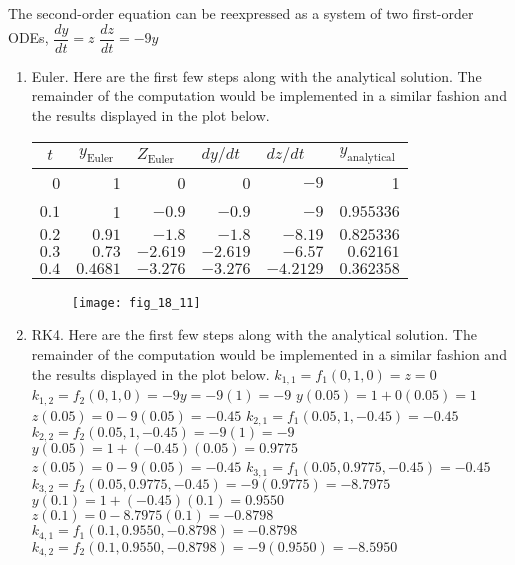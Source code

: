 \documentclass[../main.tex]{subfiles}
\begin{document}
\section{}
The second-order equation can be reexpressed as a system of two first-order ODEs,
	\bigbreak
$\dfrac{d y}{d t}=z$
	\bigbreak
$\dfrac{d z}{d t}=-9 y$
	\bigbreak
\begin{enumerate}[label=\bfseries(\alph*)]
\item Euler. Here are the first few steps along with the analytical solution. The remainder of the computation would be implemented in a similar fashion and the results displayed in the plot below.
	\bigbreak
\begin{tabular}{rrrrrr}
\hline
\multicolumn{1}{c}{$t$} & \multicolumn{1}{c}{$y_{\text {Euler }}$} & \multicolumn{1}{l}{$Z_{\text {Euler }}$} & \multicolumn{1}{l}{$d y / d t$} & \multicolumn{1}{l}{$d z / d t$} & \multicolumn{1}{l}{$y_{\text {analytical }}$} \\
\hline
0 & 1 & 0 & 0 & $-9$ & 1 \\
$0.1$ & 1 & $-0.9$ & $-0.9$ & $-9$ & $0.955336$ \\
$0.2$ & $0.91$ & $-1.8$ & $-1.8$ & $-8.19$ & $0.825336$ \\
$0.3$ & $0.73$ & $-2.619$ & $-2.619$ & $-6.57$ & $0.62161$ \\
$0.4$ & $0.4681$ & $-3.276$ & $-3.276$ & $-4.2129$ & $0.362358$ \\
\hline
\end{tabular}
	\bigbreak
	\begin{figure}[H]
		\texttt{[image: fig\_18\_11]}
		\label{fig:fig_18_11}
	\end{figure}
	\bigbreak
\item RK4. Here are the first few steps along with the analytical solution. The remainder of the computation would be implemented in a similar fashion and the results displayed in the plot below.
	\bigbreak
$k_{1,1}=f_{1}(0,1,0)=z=0 $\bigbreak
$k_{1,2}=f_{2}(0,1,0)=-9 y=-9(1)=-9 $\bigbreak
$y(0.05)=1+0(0.05)=1 $\bigbreak
$z(0.05)=0-9(0.05)=-0.45 $\bigbreak
$k_{2,1}=f_{1}(0.05,1,-0.45)=-0.45 $\bigbreak
$k_{2,2}=f_{2}(0.05,1,-0.45)=-9(1)=-9 $\bigbreak
$y(0.05)=1+(-0.45)(0.05)=0.9775 $\bigbreak
$z(0.05)=0-9(0.05)=-0.45 $\bigbreak
$k_{3,1}=f_{1}(0.05,0.9775,-0.45)=-0.45 $\bigbreak
$k_{3,2}=f_{2}(0.05,0.9775,-0.45)=-9(0.9775)=-8.7975 $\bigbreak
$y(0.1)=1+(-0.45)(0.1)=0.9550 $\bigbreak
$z(0.1)=0-8.7975(0.1)=-0.8798 $\bigbreak
$k_{4,1}=f_{1}(0.1,0.9550,-0.8798)=-0.8798 $\bigbreak
$k_{4,2}=f_{2}(0.1,0.9550,-0.8798)=-9(0.9550)=-8.5950$\bigbreak

\end{enumerate}
\end{document}
